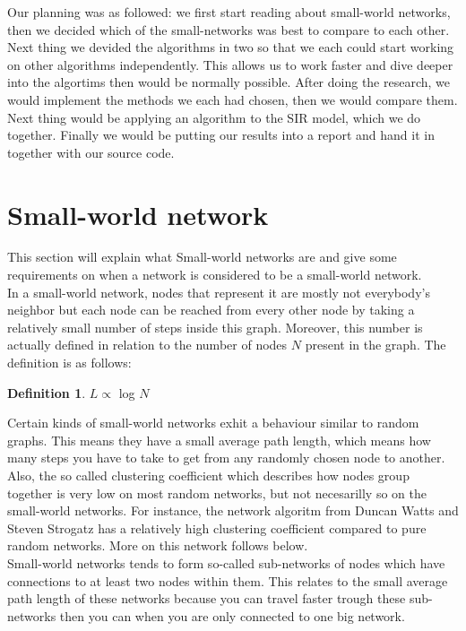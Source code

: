 \documentclass[a4paper]{article}
\theoremstyle{definition}
\newtheorem*{swn-def}{Definition}
\begin{document}
Our planning was as followed: we first start reading about small-world
networks, then we decided which of the small-networks was best to compare to
each other. Next thing we devided the algorithms in two so that we each
could start working on other algorithms independently. This allows us to
work faster and dive deeper into the algortims then would be normally 
possible. After doing the research, we would implement the methods we each
had chosen, then we would compare them. Next thing would be applying an
algorithm to the SIR model, which we do together. Finally we would be putting
our results into a report and hand it in together with our source code.

\newpage
\section{Small-world network}
This section will explain what Small-world networks are and give some
requirements on when a network is considered to be a small-world network.\\

In a small-world network, nodes that represent it are mostly not everybody's
neighbor but each node can be reached from every other node by taking a
relatively small number of steps inside this graph. Moreover, this number is
actually defined in relation to the number of nodes $N$ present in the
graph. The definition is as follows:

\begin{swn-def}
$L \propto$ log $N$
\end{swn-def}

Certain kinds of small-world networks exhit a behaviour similar to random
graphs. This means they have a small average path length, which means how 
many steps you have to take to get from any randomly chosen node to another.
Also, the so called clustering coefficient which describes how nodes group
together is very low on most random networks, but not necesarilly so on the
small-world networks. For instance, the network algoritm from Duncan Watts
and Steven Strogatz has a relatively high clustering coefficient compared
to pure random networks. More on this network follows below.\\

Small-world networks tends to form so-called sub-networks of nodes which
have connections to at least two nodes within them. This relates to the
small average path length of these networks because you can travel faster
trough these sub-networks then you can when you are only connected to one
big network.\\
\end{document}
